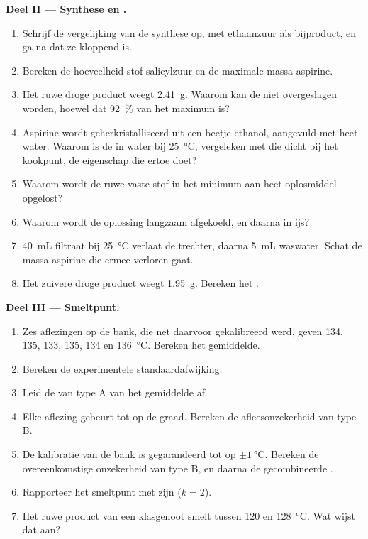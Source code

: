 \begin{problem}
\noindent\textbf{Deel II --- Synthese en .}
\begin{enumerate}[resume]
  \item Schrijf de vergelijking van de synthese op, met ethaanzuur
         als bijproduct, en ga na dat ze kloppend is.
  \item Bereken de hoeveelheid stof salicylzuur en de maximale massa
        aspirine.
  \item Het ruwe droge product weegt \qty{2.41}{g}. Waarom kan de
         niet overgeslagen worden, hoewel dat
        \qty{92}{\percent} van het maximum is?
  \item Aspirine wordt geherkristalliseerd uit een beetje ethanol,
        aangevuld met heet water. Waarom is de  in water bij
        \qty{25}{\celsius}, vergeleken met die dicht bij het kookpunt, de
        eigenschap die ertoe doet?
  \item Waarom wordt de ruwe vaste stof in het minimum aan heet
        oplosmiddel opgelost?
  \item Waarom wordt de oplossing langzaam afgekoeld, en daarna in ijs?
  \item \qty{40}{mL} filtraat bij \qty{25}{\celsius} verlaat de trechter,
        daarna \qty{5}{mL} waswater. Schat de massa aspirine die ermee
        verloren gaat.
  \item Het zuivere droge product weegt \qty{1.95}{g}. Bereken het
        .
\end{enumerate}

\noindent\textbf{Deel III --- Smeltpunt.}
\begin{enumerate}[resume]
  \item Zes aflezingen op de bank, die net daarvoor gekalibreerd werd,
        geven 134, 135, 133, 135, 134 en \qty{136}{\celsius}. Bereken het
        gemiddelde.
  \item Bereken de experimentele standaardafwijking.
  \item Leid de  van type A van het gemiddelde af.
  \item Elke aflezing gebeurt tot op de graad. Bereken de
        afleesonzekerheid van type B.
  \item De kalibratie van de bank is gegarandeerd tot op
        $\pm\qty{1}{\celsius}$. Bereken de overeenkomstige onzekerheid van
        type B, en daarna de gecombineerde .
  \item Rapporteer het smeltpunt met zijn 
        ($k = 2$).
  \item Het ruwe product van een klasgenoot smelt tussen 120 en
        \qty{128}{\celsius}. Wat wijst dat aan?
\end{enumerate}


\end{problem}
